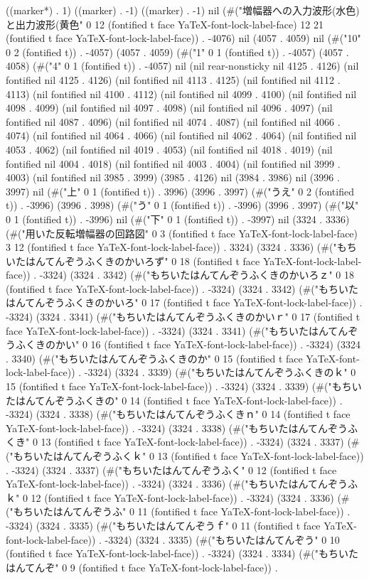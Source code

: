 ((marker*) . 1) ((marker) . -1) ((marker) . -1) nil (#("増幅器への入力波形(水色)と出力波形(黄色" 0 12 (fontified t face YaTeX-font-lock-label-face) 12 21 (fontified t face YaTeX-font-lock-label-face)) . -4076) nil (4057 . 4059) nil (#("10" 0 2 (fontified t)) . -4057) (4057 . 4059) (#("1" 0 1 (fontified t)) . -4057) (4057 . 4058) (#("4" 0 1 (fontified t)) . -4057) nil (nil rear-nonsticky nil 4125 . 4126) (nil fontified nil 4125 . 4126) (nil fontified nil 4113 . 4125) (nil fontified nil 4112 . 4113) (nil fontified nil 4100 . 4112) (nil fontified nil 4099 . 4100) (nil fontified nil 4098 . 4099) (nil fontified nil 4097 . 4098) (nil fontified nil 4096 . 4097) (nil fontified nil 4087 . 4096) (nil fontified nil 4074 . 4087) (nil fontified nil 4066 . 4074) (nil fontified nil 4064 . 4066) (nil fontified nil 4062 . 4064) (nil fontified nil 4053 . 4062) (nil fontified nil 4019 . 4053) (nil fontified nil 4018 . 4019) (nil fontified nil 4004 . 4018) (nil fontified nil 4003 . 4004) (nil fontified nil 3999 . 4003) (nil fontified nil 3985 . 3999) (3985 . 4126) nil (3984 . 3986) nil (3996 . 3997) nil (#("上" 0 1 (fontified t)) . 3996) (3996 . 3997) (#("うえ" 0 2 (fontified t)) . -3996) (3996 . 3998) (#("う" 0 1 (fontified t)) . -3996) (3996 . 3997) (#("以" 0 1 (fontified t)) . -3996) nil (#("下" 0 1 (fontified t)) . -3997) nil (3324 . 3336) (#("用いた反転増幅器の回路図" 0 3 (fontified t face YaTeX-font-lock-label-face) 3 12 (fontified t face YaTeX-font-lock-label-face)) . 3324) (3324 . 3336) (#("もちいたはんてんぞうふくきのかいろず" 0 18 (fontified t face YaTeX-font-lock-label-face)) . -3324) (3324 . 3342) (#("もちいたはんてんぞうふくきのかいろｚ" 0 18 (fontified t face YaTeX-font-lock-label-face)) . -3324) (3324 . 3342) (#("もちいたはんてんぞうふくきのかいろ" 0 17 (fontified t face YaTeX-font-lock-label-face)) . -3324) (3324 . 3341) (#("もちいたはんてんぞうふくきのかいｒ" 0 17 (fontified t face YaTeX-font-lock-label-face)) . -3324) (3324 . 3341) (#("もちいたはんてんぞうふくきのかい" 0 16 (fontified t face YaTeX-font-lock-label-face)) . -3324) (3324 . 3340) (#("もちいたはんてんぞうふくきのか" 0 15 (fontified t face YaTeX-font-lock-label-face)) . -3324) (3324 . 3339) (#("もちいたはんてんぞうふくきのｋ" 0 15 (fontified t face YaTeX-font-lock-label-face)) . -3324) (3324 . 3339) (#("もちいたはんてんぞうふくきの" 0 14 (fontified t face YaTeX-font-lock-label-face)) . -3324) (3324 . 3338) (#("もちいたはんてんぞうふくきｎ" 0 14 (fontified t face YaTeX-font-lock-label-face)) . -3324) (3324 . 3338) (#("もちいたはんてんぞうふくき" 0 13 (fontified t face YaTeX-font-lock-label-face)) . -3324) (3324 . 3337) (#("もちいたはんてんぞうふくｋ" 0 13 (fontified t face YaTeX-font-lock-label-face)) . -3324) (3324 . 3337) (#("もちいたはんてんぞうふく" 0 12 (fontified t face YaTeX-font-lock-label-face)) . -3324) (3324 . 3336) (#("もちいたはんてんぞうふｋ" 0 12 (fontified t face YaTeX-font-lock-label-face)) . -3324) (3324 . 3336) (#("もちいたはんてんぞうふ" 0 11 (fontified t face YaTeX-font-lock-label-face)) . -3324) (3324 . 3335) (#("もちいたはんてんぞうｆ" 0 11 (fontified t face YaTeX-font-lock-label-face)) . -3324) (3324 . 3335) (#("もちいたはんてんぞう" 0 10 (fontified t face YaTeX-font-lock-label-face)) . -3324) (3324 . 3334) (#("もちいたはんてんぞ" 0 9 (fontified t face YaTeX-font-lock-label-face)) . 
